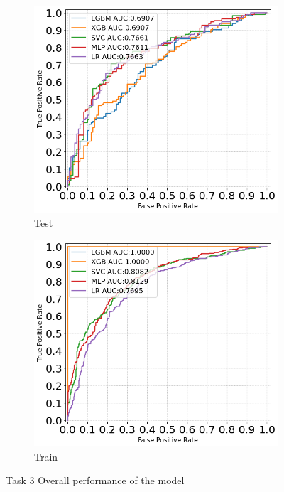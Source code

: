 \documentclass{article}
\begin{document}
\begin{figure}[H]
      \centering
      \begin{subfigure}{0.48\textwidth} %
          \includegraphics[width=\linewidth]{task3_auc_test.png} %
          \caption{Test}
          \label{fig:roctest}
      \end{subfigure}
      \hfill %
      \begin{subfigure}{0.48\textwidth} %
          \includegraphics[width=\linewidth]{task3_auc_train.png} %
          \caption{Train}
          \label{fig:roctrain}
      \end{subfigure}
      \caption{Task 3 Overall performance of the model}
      \label{fig:overall}
\end{figure}
\end{document}

